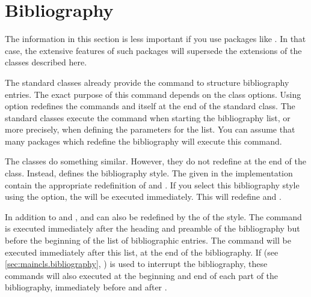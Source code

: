 \section{Bibliography}

The information in this section is less important if you use packages like
. In that case, the extensive features of such packages
will supersede the extensions of the \KOMAScript{} classes described here.

\begin{Declaration}
\end{Declaration}
The standard classes already provide the
 command to structure bibliography entries. The exact purpose
of this command depends on the class options. Using option
 redefines the commands
 and  itself at the end of the standard
class. The standard classes execute the  command when
starting the bibliography list, or more precisely, when defining the
parameters for the list. You can assume that many packages which redefine the
bibliography will execute this command.

The \KOMAScript{} classes\textnote{\KOMAScript} do something similar. However,
they do not redefine  at the end of the class. Instead,
 defines the  bibliography style. The
 given in the implementation contain the appropriate
redefinition of  and . If you select this
bibliography style using the
%
%
 option, the
 will be executed immediately. This will redefine
 and .

In addition to  and ,
 and  can also be redefined by the
 of the style. The  command is executed
immediately after the heading and preamble of the bibliography but before the
beginning of the list of bibliographic entries. The 
command will be executed immediately after this list, at the end of the
bibliography. If  (see
\autoref{sec:maincls.bibliography},
) is used to interrupt the
bibliography, these commands will also executed at the beginning and end of
each part of the bibliography, immediately before and after
.

